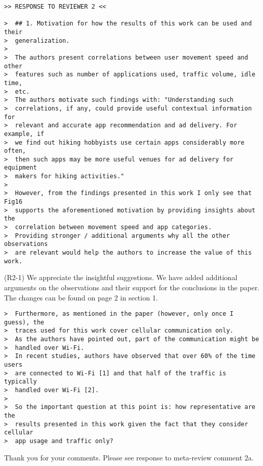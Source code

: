 \newpage
\begin{verbatim}
>> RESPONSE TO REVIEWER 2 <<
 
>  ## 1. Motivation for how the results of this work can be used and their
>  generalization.
>
>  The authors present correlations between user movement speed and other
>  features such as number of applications used, traffic volume, idle time,
>  etc.
>  The authors motivate such findings with: "Understanding such
>  correlations, if any, could provide useful contextual information for
>  relevant and accurate app recommendation and ad delivery. For example, if
>  we find out hiking hobbyists use certain apps considerably more often,
>  then such apps may be more useful venues for ad delivery for equipment
>  makers for hiking activities."
>
>  However, from the findings presented in this work I only see that Fig16
>  supports the aforementioned motivation by providing insights about the
>  correlation between movement speed and app categories.
>  Providing stronger / additional arguments why all the other observations
>  are relevant would help the authors to increase the value of this work.
\end{verbatim}

(R2-1) We appreciate the insightful suggestions. We have added additional arguments on the observations and their support for the conclusions in the paper. The changes can be found on page 2 in section 1. 

\begin{verbatim}
>  Furthermore, as mentioned in the paper (however, only once I guess), the
>  traces used for this work cover cellular communication only.
>  As the authors have pointed out, part of the communication might be
>  handled over Wi-Fi.
>  In recent studies, authors have observed that over 60% of the time users
>  are connected to Wi-Fi [1] and that half of the traffic is typically
>  handled over Wi-Fi [2].
>
>  So the important question at this point is: how representative are the
>  results presented in this work given the fact that they consider cellular
>  app usage and traffic only?
\end{verbatim}

Thank you for your comments. 
Please see response to meta-review comment 2a.

